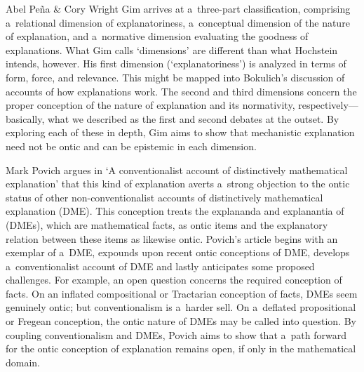 \begin{editorialeng}{Abel Peña \& Cory Wright}
Gim arrives at a~three-part classification, comprising a~relational dimension of explanatoriness, a~conceptual dimension of the nature of explanation, and a~normative dimension evaluating the goodness of explanations. What Gim calls `dimensions' are different than what Hochstein intends, however. His first dimension (`explanatoriness') is analyzed in terms of form, force, and relevance. This might be mapped into Bokulich's discussion of accounts of how explanations work. The second and third dimensions concern the proper conception of the nature of explanation and its normativity, respectively---basically, what we described as the first and second debates at the outset. By exploring each of these in depth, Gim aims to show that mechanistic explanation need not be ontic and can be epistemic in each dimension.

Mark Povich argues in `A conventionalist account of distinctively mathematical explanation' that this kind of explanation averts a~strong objection to the ontic status of other non-conventionalist accounts of distinctively mathematical explanation (DME). This conception treats the explananda and explanantia of (DMEs), which are mathematical facts, as ontic items and the explanatory relation between these items as likewise ontic. Povich's article begins with an exemplar of a~DME, expounds upon recent ontic conceptions of DME, develops a~conventionalist account of DME and lastly anticipates some proposed challenges. For example, an open question concerns the required conception of facts. On an inflated compositional or Tractarian conception of facts, DMEs seem genuinely ontic; but conventionalism is a~harder sell. On a~deflated propositional or Fregean conception, the ontic nature of DMEs may be called into question. By coupling conventionalism and DMEs, Povich aims to show that a~path forward for the ontic conception of explanation remains open, if only in the mathematical domain.


\end{editorialeng}
